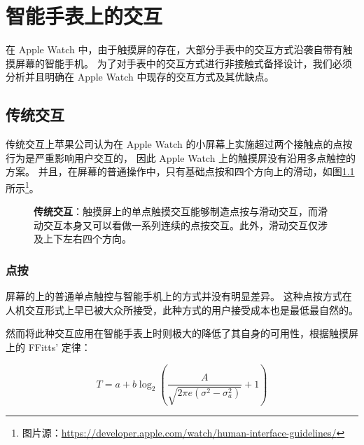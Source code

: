 \chapter{智能手表上的交互}

在 Apple Watch 中，由于触摸屏的存在，大部分手表中的交互方式沿袭自带有触摸屏幕的智能手机\cite{WatchGuidelines:2016}。
为了对手表中的交互方式进行非接触式备择设计，我们必须分析并且明确在 Apple Watch 中现存的交互方式及其优缺点。

\section{传统交互}

传统交互上苹果公司认为在 Apple Watch 的小屏幕上实施超过两个接触点的点按行为是严重影响用户交互的，
因此 Apple Watch 上的触摸屏没有沿用多点触控的方案。
并且，在屏幕的普通操作中，只有基础点按和四个方向上的滑动，如图\ref{fig:gesture}所示\footnote{图片源：\url{https://developer.apple.com/watch/human-interface-guidelines/}}。

\begin{figure}[H]
    \kaishu
    \centering
    \caption{\textbf{传统交互}：触摸屏上的单点触摸交互能够制造点按与滑动交互，而滑动交互本身又可以看做一系列连续的点按交互。此外，滑动交互仅涉及上下左右四个方向。}
    \label{fig:gesture}
\end{figure}

\subsection{点按}

屏幕的上的普通单点触控与智能手机上的方式并没有明显差异。
这种点按方式在人机交互形式上早已被大众所接受，此种方式的用户接受成本也是最低最自然的。

然而将此种交互应用在智能手表上时则极大的降低了其自身的可用性，根据触摸屏上的 FFitts' 定律\cite{Bi:2013:FLM:2470654.2466180}：

\begin{equation}
T=a+b\log_{2}{\left(\frac{A}{\sqrt{2\pi e(\sigma^2-\sigma_{a}^2)}}+1 \right)}
\end{equation}

